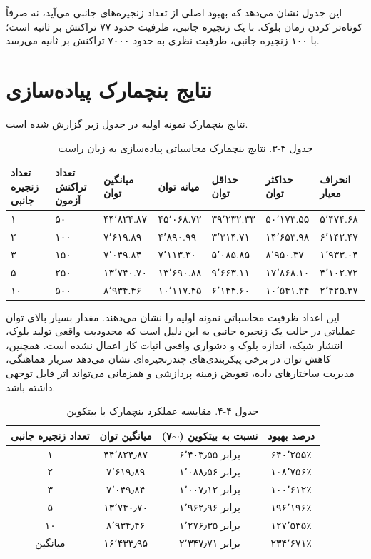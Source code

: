 این جدول نشان می‌دهد که بهبود اصلی از تعداد زنجیره‌های جانبی می‌آید، نه صرفاً کوتاه‌تر کردن زمان بلوک. با یک زنجیره جانبی، ظرفیت حدود ۷۷ تراکنش بر ثانیه است؛ با ۱۰۰ زنجیره جانبی، ظرفیت نظری به حدود ۷۰۰۰ تراکنش بر ثانیه می‌رسد.

\section{نتایج بنچمارک پیاده‌سازی}

نتایج بنچمارک نمونه اولیه در جدول زیر گزارش شده است.

\begin{table}[h]
\centering
\caption{جدول ۴-۳. نتایج بنچمارک محاسباتی پیاده‌سازی به زبان راست}
\small
\begin{tabular}{|p{1.4cm}|p{1.5cm}|p{1.5cm}|p{1.5cm}|p{1.5cm}|p{1.5cm}|p{1.6cm}|}
\hline
تعداد زنجیره جانبی & تعداد تراکنش آزمون & میانگین توان & میانه توان & حداقل توان & حداکثر توان & انحراف معیار \\
\hline
۱ & ۵۰ & ۴۴٬۸۲۴.۸۷ & ۴۵٬۰۶۸.۷۲ & ۳۹٬۲۳۲.۳۳ & ۵۰٬۱۷۳.۵۵ & ۵٬۴۷۴.۶۸ \\
\hline
۲ & ۱۰۰ & ۷٬۶۱۹.۸۹ & ۴٬۸۹۰.۹۹ & ۳٬۳۱۴.۷۱ & ۱۴٬۶۵۳.۹۸ & ۶٬۱۴۲.۴۷ \\
\hline
۳ & ۱۵۰ & ۷٬۰۴۹.۸۴ & ۷٬۱۱۳.۳۰ & ۵٬۰۸۵.۸۵ & ۸٬۹۵۰.۳۷ & ۱٬۹۳۳.۰۴ \\
\hline
۵ & ۲۵۰ & ۱۳٬۷۴۰.۷۰ & ۱۳٬۶۹۰.۸۸ & ۹٬۶۶۳.۱۱ & ۱۷٬۸۶۸.۱۰ & ۴٬۱۰۲.۷۲ \\
\hline
۱۰ & ۵۰۰ & ۸٬۹۳۴.۴۶ & ۱۰٬۱۱۷.۴۵ & ۶٬۱۴۴.۶۰ & ۱۰٬۵۴۱.۳۴ & ۲٬۴۲۵.۳۷ \\
\hline
\end{tabular}
\end{table}

این اعداد ظرفیت محاسباتی نمونه اولیه را نشان می‌دهند. مقدار بسیار بالای توان عملیاتی در حالت یک زنجیره جانبی به این دلیل است که محدودیت واقعی تولید بلوک، انتشار شبکه، اندازه بلوک و دشواری واقعی اثبات کار اعمال نشده است. همچنین، کاهش توان در برخی پیکربندی‌های چندزنجیره‌ای نشان می‌دهد سربار هماهنگی، مدیریت ساختارهای داده، تعویض زمینه پردازشی و همزمانی می‌تواند اثر قابل توجهی داشته باشد.

\begin{table}[h]
\centering
\caption{جدول ۴-۴. مقایسه عملکرد بنچمارک با بیتکوین}
\label{tab:bitcoin-comparison}
\small
\begin{tabular}{|c|c|c|c|}
\hline
تعداد زنجیره جانبی & میانگین توان & نسبت به بیتکوین ($\sim$۷) & درصد بهبود \\
\hline
۱ & ۴۴٬۸۲۴٫۸۷ & ۶٬۴۰۳٫۵۵ برابر & ۶۴۰٬۲۵۵٪ \\
\hline
۲ & ۷٬۶۱۹٫۸۹ & ۱٬۰۸۸٫۵۶ برابر & ۱۰۸٬۷۵۶٪ \\
\hline
۳ & ۷٬۰۴۹٫۸۴ & ۱٬۰۰۷٫۱۲ برابر & ۱۰۰٬۶۱۲٪ \\
\hline
۵ & ۱۳٬۷۴۰٫۷۰ & ۱٬۹۶۲٫۹۶ برابر & ۱۹۶٬۱۹۶٪ \\
\hline
۱۰ & ۸٬۹۳۴٫۴۶ & ۱٬۲۷۶٫۳۵ برابر & ۱۲۷٬۵۳۵٪ \\
\hline
میانگین & ۱۶٬۴۳۳٫۹۵ & ۲٬۳۴۷٫۷۱ برابر & ۲۳۴٬۶۷۱٪ \\
\hline
\end{tabular}
\end{table}

